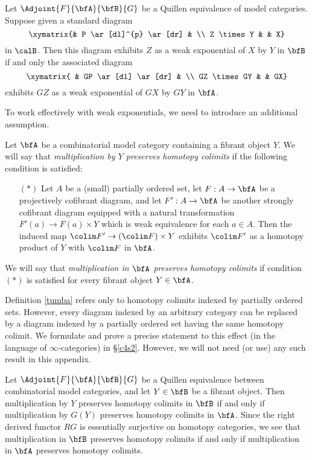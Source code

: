 \begin{remark}\label{toofus}
Let $\Adjoint{F}{\bfA}{\bfB}{G}$ be a Quillen equivalence of model categories.
Suppose given a standard diagram
$$ \xymatrix{&  P \ar[dl]^{p} \ar[dr] &  \\
Z \times Y & & X}$$
in $\calB$. Then this diagram exhibits $Z$ as a weak exponential of $X$ by $Y$ in
$\bfB$ if and only the associated diagram
$$ \xymatrix{ & GP \ar[dl] \ar[dr] & \\
GZ \times GY & & GX}$$
exhibits $GZ$ as a weak exponential of $GX$ by $GY$ in $\bfA$.
\end{remark}

To work effectively with weak exponentials, we need to introduce an additional assumption.

\begin{definition}\label{tumba}
Let $\bfA$ be a combinatorial model category containing a fibrant object
$Y$. We will say that {\it multiplication by $Y$ preserves homotopy colimits}
if the following condition is satisfied:
\begin{itemize}
\item[$(\ast)$] Let $A$ be a (small) partially ordered set, let $F: A \rightarrow \bfA$
be a projectively cofibrant diagram, and let $F': A \rightarrow \bfA$ be another strongly
cofibrant diagram equipped with a natural transformation $F'(a) \rightarrow F(a) \times Y$
which is weak equivalence for each $a \in A$. Then the induced map
$\colim F' \rightarrow (\colim F) \times Y$ exhibits $\colim F'$ as a homotopy product
of $Y$ with $\colim F$ in $\bfA$.
\end{itemize}
We will say that {\it multiplication in $\bfA$ preserves homotopy colimits} if
condition $(\ast)$ is satisfied for every fibrant object $Y \in \bfA$.
\end{definition}

\begin{remark}
Definition \ref{tumba} refers only to homotopy colimits indexed by partially ordered sets.
However, every diagram indexed by an arbitrary category can be replaced by a diagram
indexed by a partially ordered set having the same homotopy colimit. We formulate and prove a precise statement to this effect (in the language of $\infty$-categories) in \S \ref{c4s2}. However, we will not need (or use) any such result in this appendix.
\end{remark}

\begin{remark}\label{canus}
Let $\Adjoint{F}{\bfA}{\bfB}{G}$ be a Quillen equivalence between combinatorial
model categories, and let $Y \in \bfB$ be a fibrant object. Then multiplication by
$Y$ preserves homotopy colimits in $\bfB$ if and only if multiplication by
$G(Y)$ preserves homotopy colimits in $\bfA$. Since the right derived functor $RG$
is essentially surjective on homotopy categories, we see that
multiplication in $\bfB$ preserves homotopy colimits if and only if multiplication in $\bfA$ preserves homotopy colimits.
\end{remark}

